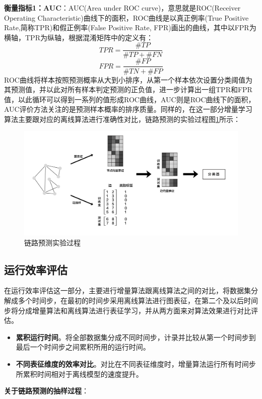 \textbf{衡量指标1：AUC}：AUC(Area under ROC curve)，意思就是ROC(Receiver Operating Characteristic)曲线下的面积，ROC曲线是以真正例率(True Positive Rate,简称TPR)和假正例率(False Positive Rate, FPR)画出的曲线，其中以FPR为横轴，TPR为纵轴，根据混淆矩阵中的定义有：
\begin{equation}
	TPR = \frac{\#TP}{\#TP+\#FN}
\end{equation}
\begin{equation}
FPR = \frac{\#FP}{\#TN+\#FP}
\end{equation}
ROC曲线将样本按照预测概率从大到小排序，从第一个样本依次设置分类阈值为其预测值，并以此对所有样本判定预测的正负值，进一步计算出一组TPR和FPR值，以此循环可以得到一系列的值形成ROC曲线，AUC则是ROC曲线下的面积，AUC评价方法关注的是预测样本概率的排序质量。同样的，在这一部分增量学习算法主要跟对应的离线算法进行准确性对比，链路预测的实验过程图\ref{fig:link_prediction_process}所示：
\begin{figure}
	\centering
	\includegraphics[width=6in]{figures/link_predict_frame}
	\caption{链路预测实验过程}
	\label{fig:link_prediction_process}
\end{figure}

\subsection{运行效率评估}
在运行效率评估这一部分，主要进行增量算法跟离线算法之间的对比，将数据集分解成多个时间步，在最初的时间步采用离线算法进行图表征，在第二个及以后时间步将分成增量算法和离线算法进行表征学习，并从两方面来对算法效果进行对比评估。
\begin{itemize}
	\item \textbf{累积运行时间}。将全部数据集分成不同时间步，计录并比较从第一个时间步到最后一个时间步之间累积所用的运行时间。
	\item \textbf{不同表征维度的效率对比}。对比在不同表征维度时，增量算法运行所有时间步所累积时间相对于离线模型的速度提升。 
\end{itemize}
\remark \textbf{关于链路预测的抽样过程}：


